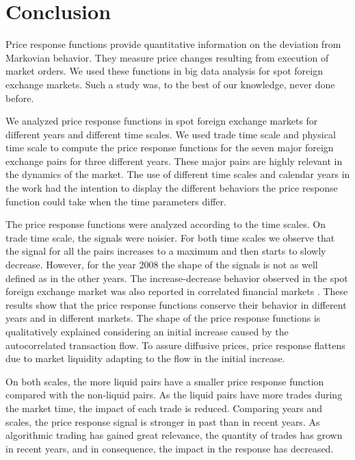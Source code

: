 \section{Conclusion}\label{sec:conclusion}

Price response functions provide quantitative information on the deviation from
Markovian behavior. They measure price changes resulting from execution of
market orders. We used these functions in big data analysis for spot foreign
exchange markets. Such a study was, to the best of our knowledge, never done
before.

We analyzed price response functions in spot foreign exchange markets for
different years and different time scales. We used trade time scale and
physical time scale to compute the price response functions for the seven major
foreign exchange pairs for three different years. These major pairs are highly
relevant in the dynamics of the market. The use of different time scales and
calendar years in the work had the intention to display the different behaviors
the price response function could take when the time parameters differ.

The price response functions were analyzed according to the time scales. On
trade time scale, the signals were noisier. For both time scales we observe
that the signal for all the pairs increases to a maximum and then starts to
slowly decrease. However, for the year 2008 the shape of the signals is not as
well defined as in the other years. The increase-decrease behavior observed in
the spot foreign exchange market was also reported in correlated financial
markets \cite{my_paper_response_financial,Wang_2016_avg}. These results show
that the price response functions conserve their behavior in different years
and in different markets. The shape of the price
response functions is qualitatively explained considering an initial increase caused by the autocorrelated
transaction flow. To assure diffusive prices, price response flattens due to
market liquidity adapting to the flow in the initial increase.

On both scales, the more liquid pairs have a smaller price response function
compared with the non-liquid pairs. As the liquid pairs have more trades during
the market time, the impact of each trade is reduced. Comparing years and
scales, the price response signal is stronger in past than in recent years. As
algorithmic trading has gained great relevance, the quantity of trades has
grown in recent years, and in consequence, the impact in the response has
decreased.


